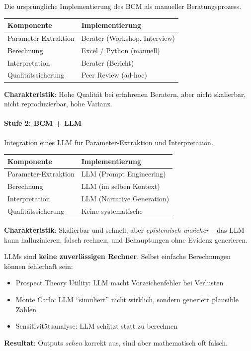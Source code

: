 Die ursprüngliche Implementierung des BCM als manueller Beratungsprozess.

\begin{table}[h]
\centering
\small
\begin{tabular}{@{}ll@{}}
\toprule
\textbf{Komponente} & \textbf{Implementierung} \\
\midrule
Parameter-Extraktion & Berater (Workshop, Interview) \\
Berechnung & Excel / Python (manuell) \\
Interpretation & Berater (Bericht) \\
Qualitätssicherung & Peer Review (ad-hoc) \\
\bottomrule
\end{tabular}
\end{table}

\textbf{Charakteristik}: Hohe Qualität bei erfahrenen Beratern, aber nicht skalierbar, nicht reproduzierbar, hohe Varianz.

\paragraph{Stufe 2: BCM + LLM}

Integration eines LLM für Parameter-Extraktion und Interpretation.

\begin{table}[h]
\centering
\small
\begin{tabular}{@{}ll@{}}
\toprule
\textbf{Komponente} & \textbf{Implementierung} \\
\midrule
Parameter-Extraktion & LLM (Prompt Engineering) \\
Berechnung & LLM (im selben Kontext) \\
Interpretation & LLM (Narrative Generation) \\
Qualitätssicherung & Keine systematische \\
\bottomrule
\end{tabular}
\end{table}

\textbf{Charakteristik}: Skalierbar und schnell, aber \textit{epistemisch unsicher} -- das LLM kann halluzinieren, falsch rechnen, und Behauptungen ohne Evidenz generieren.

\begin{tcolorbox}[colback=red!5!white, colframe=red!75!black, title=Kritisches Problem: LLM als Taschenrechner]
LLMs sind \textbf{keine zuverlässigen Rechner}. Selbst einfache Berechnungen können fehlerhaft sein:
\begin{itemize}
    \item Prospect Theory Utility: LLM macht Vorzeichenfehler bei Verlusten
    \item Monte Carlo: LLM ``simuliert'' nicht wirklich, sondern generiert plausible Zahlen
    \item Sensitivitätsanalyse: LLM schätzt statt zu berechnen
\end{itemize}
\textbf{Resultat}: Outputs \textit{sehen} korrekt aus, sind aber mathematisch oft falsch.
\end{tcolorbox}

